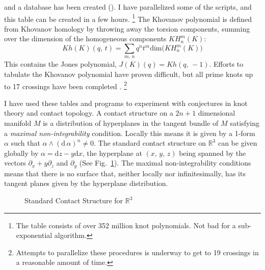 \documentclass{article}
\theoremstyle{plain}
\begin{document}
        and a database has been created (\cite{HOMFLYData}). I have parallelized
        some of the scripts, and this table can be created in a few hours.%
        \footnote{%
            The table consists of over 352 million knot polynomials. Not bad
            for a sub-exponential algorithm.
        }
        The Khovanov polynomial is defined from Khovanov homology by throwing
        away the torsion components, summing over the dimension of the
        homogeneous components
        $KH_{n}^{m}(K)$:
        \begin{equation}
            Kh(K)(q,\,t)=\sum_{m,\,n}
                q^{n}t^{m}\textrm{dim}\big(KH_{n}^{m}(K)\big)
        \end{equation}
        This contains the Jones polynomial, $J(K)(q)=Kh(q,\,-1)$. Efforts to
        tabulate the Khovanov polynomial have proven difficult, but all prime
        knots up to 17 crossings have been completed \cite{KhovanovData}.%
        \footnote{%
            Attempts to parallelize these procedures is underway to get to
            19 crossings in a reasonable amount of time.
        }
        \par\hfill\par
        I have used these tables and programs to experiment with conjectures in
        knot theory and contact topology. A contact structure on a
        $2n+1$ dimensional manifold $M$ is a distribution of hyperplanes in the
        tangent bundle of $M$ satisfying a \textit{maximal non-integrability}
        condition. Locally this means it is given by a 1-form $\alpha$ such
        that $\alpha\land(\textrm{d}\,\alpha)^{n}\ne{0}$. The standard contact
        structure on $\mathbb{R}^{3}$ can be given globally by
        $\alpha=\textrm{d}z-y\textrm{d}x$, the hyperplane at $(x,\,y,\,z)$
        being spanned by the vectors $\partial_{x}+y\partial_{z}$ and
        $\partial_{y}$ (See Fig.~\ref{fig:darboux_form}). The maximal
        non-integrability conditions means that there is no surface that,
        neither locally nor infinitesimally, has its tangent planes given by
        the hyperplane distribution.
        \begin{figure}
            \centering
            \caption{Standard Contact Structure for $\mathbb{R}^{3}$}
            \label{fig:darboux_form}
        \end{figure}
\end{document}
